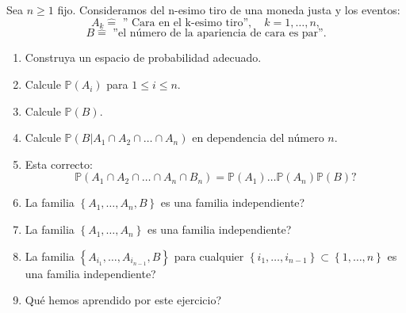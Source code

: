 \documentclass[notitlepage]{article}
\theoremstyle{definition}
\theoremstyle{remark}
\newcommand{\set}[1]{\left\lbrace #1 \right\rbrace}
\begin{document}
	Sea $ n \geq 1 $ fijo. Consideramos del n-esimo tiro de una moneda justa y los eventos:
	\[ A_k \hat{=} \textrm{ '' Cara en el k-esimo tiro''}, \quad k = 1,\ldots,n, \]
	\[ B \hat{=} \textrm{ ''el número de la apariencia de cara es par''}. \]
	
	\begin{enumerate}[1)]
		\item Construya un espacio de probabilidad adecuado.
		\item Calcule $ \mathbb{P}(A_i) $ para $ 1 \leq i \leq n $.
		\item Calcule $ \mathbb{P}(B) $.
		\item Calcule $ \mathbb{P}(B|A_1 \cap A_2 \cap \ldots \cap A_n) $ en dependencia del número $ n $.
		\item Esta correcto:
		\[ \mathbb{P}(A_1 \cap A_2 \cap \ldots \cap A_n \cap B_n) = \mathbb{P}(A_1)\ldots\mathbb{P}(A_n)\mathbb{P}(B) \textrm{?}\] 
		\item La familia $ \set{A_1, \ldots, A_n,B} $ es una familia independiente?
		\item La familia $ \set{A_1,\ldots, A_n} $ es una familia independiente?
		\item La familia $ \set{A_{i_1}, \ldots,A_{i_{n-1}},B} $ para cualquier $ \set{i_1, \ldots, i_{n-1}} \subset \set{1, \ldots, n} $ es una familia independiente?
		\item Qué hemos aprendido por este ejercicio?
	\end{enumerate}
\end{document}
